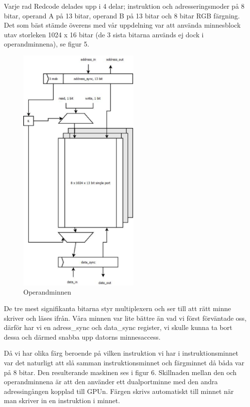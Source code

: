 \documentclass[11pt]{article}
\begin{document}
Varje rad Redcode delades upp i 4 delar; instruktion och adresseringsmoder på 8 bitar, operand A på 13 bitar, operand B på 13 bitar och 8 bitar RGB färgning. Det som bäst stämde överens med vår uppdelning var att använda minnesblock utav storleken 1024 x 16 bitar (de 3 sista bitarna används ej dock i operandminnena), se figur 5.

\begin{figure}[h]
    \begin{center}
        \includegraphics[width=6cm]{memory_cell.eps}
        \caption{Operandminnen}
        \label{fig:memory_cell}
    \end{center}
\end{figure}

De tre mest signifikanta bitarna styr multiplexern och ser till att rätt minne skriver och läses ifrån. Våra minnen var lite bättre än vad vi först förväntade oss, därför har vi en adress\_sync och data\_sync register, vi skulle kunna ta bort dessa och därmed snabba upp datorns minnesaccess.

Då vi har olika färg beroende på vilken instruktion vi har i instruktionsminnet var det naturligt att slå samman instruktionsminnet och färgminnet då båda var på 8 bitar. Den resulterande maskinen ses i figur 6. Skillnaden mellan den och operandminnena är att den använder ett dualportminne med den andra adressingången kopplad till GPUn. Färgen skrivs automatiskt till minnet när man skriver in en instruktion i minnet.
\end{document}
